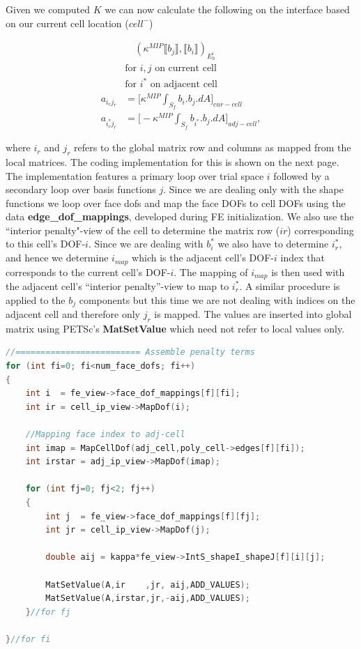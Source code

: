 \documentclass[11pt,letterpaper,titlepage]{article}
\numberwithin{equation}{section}
\begin{document}
Given we computed $K$ we can now calculate the following on the interface
based on our current cell location ($cell^-$)

\begin{equation}
\begin{aligned}
& \quad (\kappa^{MIP} \llbracket b_j \rrbracket,\llbracket b_i \rrbracket)_{E_h^i} \\
&\text{for }i,j \text{ on current cell}\\
&\text{for }i^* \text{ on adjacent cell}\\
a_{i_rj_r} &= \biggr[ \kappa^{MIP} \int_{S_f} b_i.b_j.dA \biggr]_{cur-cell}\\
a_{i_r^*j_r} &= \biggr[ -\kappa^{MIP} \int_{S_f} b_{i^*}.b_j.dA \biggr]_{adj-cell},
\end{aligned}
\end{equation}

where $i_r$ and $j_r$ refers to the global matrix row and columns as 
mapped from the local matrices. The coding implementation for this is 
shown on the next page.
\newline
\newline
The implementation features a primary loop over trial space $i$ followed by a 
secondary loop over basis functions $j$. Since we are dealing only with the 
shape functions we loop over face dofs and map the face DOFs to cell DOFs using
the data \textbf{edge\_dof\_mappings}, developed during FE initialization. We
also use the ``interior penalty"-view of the cell to determine the matrix row
($ir$) corresponding to this cell's DOF-$i$. Since we are dealing with $b_i^*$ 
we also have to determine $i_r^*$, and hence we determine $i_{map}$ which is the
adjacent cell's DOF-$i$ index that corresponds to the current cell's DOF-$i$. 
The mapping of $i_{map}$ is then used with the adjacent cell's 
``interior penalty''-view to map to $i_r^*$. A similar procedure is applied to
the $b_j$ components but this time we are not dealing with indices on the adjacent
cell and therefore only $j_r$ is mapped. The values are inserted into global
matrix using PETSc's \textbf{MatSetValue} which need not refer to local values 
only.
\vspace{0.5cm}
\begin{lstlisting}[language=c++]
//========================= Assemble penalty terms
for (int fi=0; fi<num_face_dofs; fi++)
{
	int i  = fe_view->face_dof_mappings[f][fi];
	int ir = cell_ip_view->MapDof(i);

	//Mapping face index to adj-cell
	int imap = MapCellDof(adj_cell,poly_cell->edges[f][fi]);
	int irstar = adj_ip_view->MapDof(imap);

	for (int fj=0; fj<2; fj++)
	{
		int j  = fe_view->face_dof_mappings[f][fj];
		int jr = cell_ip_view->MapDof(j);

		double aij = kappa*fe_view->IntS_shapeI_shapeJ[f][i][j];

		MatSetValue(A,ir    ,jr, aij,ADD_VALUES);
		MatSetValue(A,irstar,jr,-aij,ADD_VALUES);
	}//for fj

}//for fi
\end{lstlisting}
\end{document}
